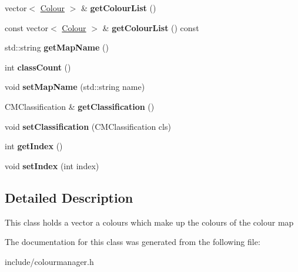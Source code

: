 \begin{DoxyCompactItemize}
vector$<$ \hyperlink{classColour}{Colour} $>$ \& {\bfseries get\+Colour\+List} ()
\item 
\mbox{\label{classColourMap_ad32d03ad58020111e0d4699b0a4e597f}} 
const vector$<$ \hyperlink{classColour}{Colour} $>$ \& {\bfseries get\+Colour\+List} () const
\item 
\mbox{\label{classColourMap_a08e9add60b5a7497166a8a7e5a0f860f}} 
std\+::string {\bfseries get\+Map\+Name} ()
\item 
\mbox{\label{classColourMap_aa8264cc2845d1253b8e8ede44be6e1c2}} 
int {\bfseries class\+Count} ()
\item 
\mbox{\label{classColourMap_a0b1cfc5babfee416f8f2337712581eab}} 
void {\bfseries set\+Map\+Name} (std\+::string name)
\item 
\mbox{\label{classColourMap_a2802e6f099c8e224f7cb2d3d8dc3f4be}} 
C\+M\+Classification \& {\bfseries get\+Classification} ()
\item 
\mbox{\label{classColourMap_a55bc63f784729b5ddda3180174842d29}} 
void {\bfseries set\+Classification} (C\+M\+Classification cls)
\item 
\mbox{\label{classColourMap_a4ef1038500ed24a5563cf0955d622e02}} 
int {\bfseries get\+Index} ()
\item 
\mbox{\label{classColourMap_a46ab3be1dc047c89f526d31e824f819e}} 
void {\bfseries set\+Index} (int index)
\end{DoxyCompactItemize}


\subsection{Detailed Description}
This class holds a vector a colours which make up the colours of the colour map 

The documentation for this class was generated from the following file\+:\begin{DoxyCompactItemize}
\item 
include/colourmanager.\+h\end{DoxyCompactItemize}
